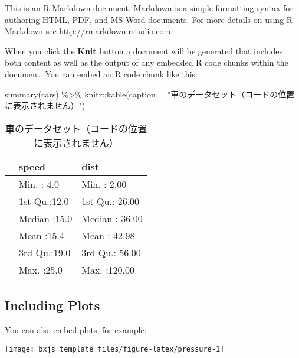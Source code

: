 \documentclass[
  12pt,
  a4paper,
  xelatex,
  ja=standard]{bxjsarticle}
\newenvironment{Shaded}{\begin{snugshade}}{\end{snugshade}}
\newcommand{\AttributeTok}[1]{\textcolor[rgb]{0.77,0.63,0.00}{#1}}
\newcommand{\FunctionTok}[1]{\textcolor[rgb]{0.00,0.00,0.00}{#1}}
\newcommand{\NormalTok}[1]{#1}
\newcommand{\SpecialCharTok}[1]{\textcolor[rgb]{0.00,0.00,0.00}{#1}}
\newcommand{\StringTok}[1]{\textcolor[rgb]{0.31,0.60,0.02}{#1}}
\begin{document}
This is an R Markdown document. Markdown is a simple formatting syntax
for authoring HTML, PDF, and MS Word documents. For more details on
using R Markdown see \url{http://rmarkdown.rstudio.com}.

When you click the \textbf{Knit} button a document will be generated
that includes both content as well as the output of any embedded R code
chunks within the document. You can embed an R code chunk like this:

\begin{Shaded}
\begin{Highlighting}[numbers=left,,]
\FunctionTok{summary}\NormalTok{(cars) }\SpecialCharTok{\%\textgreater{}\%}
\NormalTok{  knitr}\SpecialCharTok{::}\FunctionTok{kable}\NormalTok{(}\AttributeTok{caption =} \StringTok{"車のデータセット（コードの位置に表示されません）"}\NormalTok{)}
\end{Highlighting}
\end{Shaded}

\begin{table}

\caption{\label{tab:cars}車のデータセット（コードの位置に表示されません）}
\centering
\begin{tabular}[t]{l|l|l}
\hline
  &     speed &      dist\\
\hline
 & Min.   : 4.0 & Min.   :  2.00\\
\hline
 & 1st Qu.:12.0 & 1st Qu.: 26.00\\
\hline
 & Median :15.0 & Median : 36.00\\
\hline
 & Mean   :15.4 & Mean   : 42.98\\
\hline
 & 3rd Qu.:19.0 & 3rd Qu.: 56.00\\
\hline
 & Max.   :25.0 & Max.   :120.00\\
\hline
\end{tabular}
\end{table}

\newpage

\hypertarget{including-plots}{%
\subsection{Including Plots}\label{including-plots}}

You can also embed plots, for example:

\begin{center}\texttt{[image: bxjs\_template\_files/figure-latex/pressure-1]} \end{center}
\end{document}
